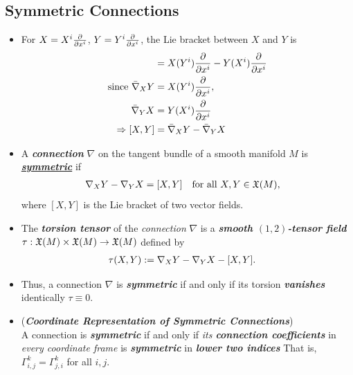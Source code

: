 \documentclass[11pt]{article}
\begin{document}
\subsection{Symmetric Connections}
\begin{itemize}
\item \begin{remark}
For $X = X^i \frac{\partial }{ \partial x^i}$, $Y = Y^i \frac{\partial }{ \partial x^i}$, the Lie bracket between $X$ and $Y$ is
\begin{align*}
[X, Y] &= X(Y^i)\partdiff{}{x^i} - Y(X^i)\partdiff{}{x^i} \\
\text{since }\bar{\nabla}_{X}Y &= X(Y^i)\partdiff{}{x^i}, \\
\bar{\nabla}_{Y}X &= Y(X^i)\partdiff{}{x^i} \\
\Rightarrow [X, Y]  &=  \bar{\nabla}_{X}Y - \bar{\nabla}_{Y}X
\end{align*}
\end{remark}

\item \begin{definition}
A \emph{\textbf{connection}} $\nabla$ on the tangent bundle of a smooth manifold $M$ is \underline{\emph{\textbf{symmetric}}} if
\begin{align*}
\nabla_{X}{Y} - \nabla_{Y}{X} &= [X, Y]  \quad \text{for all }X,Y \in {\mathfrak X}(M),
\end{align*} where $[X, Y]$ is the Lie bracket of two vector fields.
\end{definition}

\item \begin{definition}
The \emph{\textbf{torsion tensor}} of the \emph{connection} $\nabla$ is a \emph{\textbf{smooth $(1,2)$-tensor field}} $\tau: {\mathfrak X}(M) \times {\mathfrak X}(M) \rightarrow {\mathfrak X}(M)$ defined by
\begin{align*}
\tau(X, Y) &:= \nabla_{X}{Y} - \nabla_{Y}{X} - [X, Y].
\end{align*}
\end{definition}

\item \begin{remark}
Thus, a connection $\nabla$ is \emph{\textbf{symmetric}} if and only if its torsion \emph{\textbf{vanishes}} identically $\tau \equiv 0$.
\end{remark}

\item \begin{remark} (\emph{\textbf{Coordinate Representation of Symmetric Connections}})\\
A connection is \emph{\textbf{symmetric}} if and only if \emph{its \textbf{connection coefficients}} in \emph{every coordinate frame} is \emph{\textbf{symmetric}} in \emph{\textbf{lower two indices}} That is, \underline{$\Gamma_{i,j}^{k} = \Gamma_{j,i}^{k}$} for all $i,j$. 
\end{remark}


\end{itemize}
\end{document}
